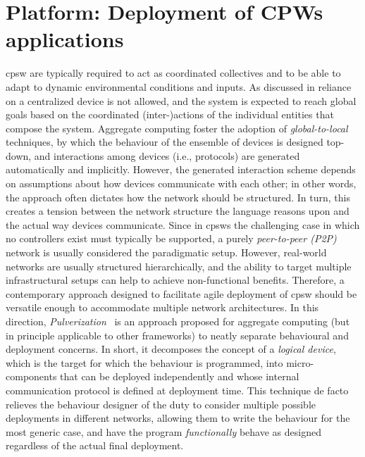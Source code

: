 \chapter{Platform: Deployment of CPWs applications}\label{chap:eng:multitier}%
\minitoc%
%
\newcommand{\scalaloci}{{ScalaLoci}}
\newcommand{\scafiloci}{{ScaFiLoci}}
\newcommand{\scalainline}[1]{\lstinline{#1}}
\ac{cpsw} are typically required 
 to act as coordinated collectives
 and to be able to adapt to dynamic
 environmental conditions and inputs.
%
%
As discussed in  reliance on a centralized device is not allowed,
and the system is expected to reach global goals based 
 on the coordinated (inter-)actions of the individual entities that compose the system.
Aggregate computing foster the adoption of \emph{global-to-local} techniques,
by which the behaviour of the ensemble of devices is designed top-down,
and interactions among devices (i.e., protocols) are generated automatically and implicitly.
%
However, the generated interaction scheme depends on assumptions about how devices communicate with each other;
in other words, the approach often dictates how the network should be structured.
%
In turn, this creates a tension between the network structure the language reasons upon and the actual way devices communicate.
%
Since in \acp{cpsw} the challenging case in which no controllers exist must typically be supported, 
 a purely \emph{peer-to-peer (P2P)} network is usually considered the paradigmatic setup.
%
However, real-world networks are usually structured hierarchically, 
 and the ability to target multiple infrastructural setups can help to achieve non-functional benefits.
%
Therefore, a contemporary approach designed to facilitate agile deployment of \ac{cpsw} should be versatile enough to accommodate multiple network architectures.
In this direction, \emph{Pulverization}~\cite{DBLP:journals/fi/CasadeiPPVW20}
 is an approach proposed for aggregate computing 
 (but in principle applicable to other frameworks) 
 to neatly separate behavioural and deployment concerns.
%
In short, it decomposes the concept of a \emph{logical device}, 
 which is the target for which the behaviour is programmed,
 into micro-components that can be deployed independently
 and whose internal communication protocol is defined at deployment time.
%
This technique de facto relieves the behaviour designer of the duty 
 to consider multiple possible  deployments in different networks, 
 allowing them to write the behaviour for the most generic case, 
 and have the program \emph{functionally} behave as designed regardless of the actual final deployment.

